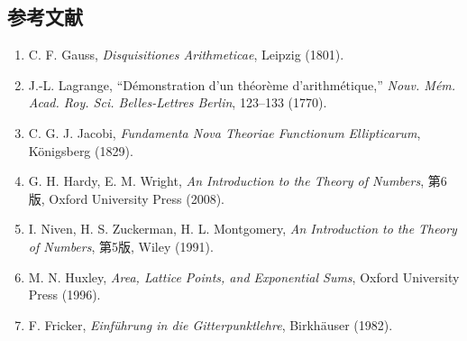 \documentclass[a4paper,11pt]{ltjsarticle}
\theoremstyle{definition}
\providecommand{\tightlist}{\setlength{\itemsep}{0pt}\setlength{\parskip}{0pt}}
\begin{document}
\subsection{参考文献}\label{ux53c2ux8003ux6587ux732e}

\begin{enumerate}
\def\labelenumi{\arabic{enumi}.}
\tightlist
\item
  C. F. Gauss, \emph{Disquisitiones Arithmeticae}, Leipzig (1801).
\item
  J.-L. Lagrange, ``Démonstration d'un théorème d'arithmétique,''
  \emph{Nouv. Mém. Acad. Roy. Sci. Belles-Lettres Berlin}, 123--133
  (1770).
\item
  C. G. J. Jacobi, \emph{Fundamenta Nova Theoriae Functionum
  Ellipticarum}, Königsberg (1829).
\item
  G. H. Hardy, E. M. Wright, \emph{An Introduction to the Theory of
  Numbers}, 第6版, Oxford University Press (2008).
\item
  I. Niven, H. S. Zuckerman, H. L. Montgomery, \emph{An Introduction to
  the Theory of Numbers}, 第5版, Wiley (1991).
\item
  M. N. Huxley, \emph{Area, Lattice Points, and Exponential Sums},
  Oxford University Press (1996).
\item
  F. Fricker, \emph{Einführung in die Gitterpunktlehre}, Birkhäuser
  (1982).
\end{enumerate}
\end{document}
